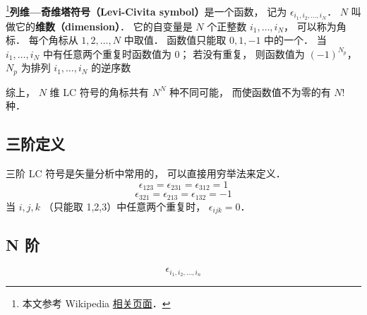 
\begin{issues}
\issueDraft
\end{issues}

\footnote{本文参考 Wikipedia \href{https://en.wikipedia.org/wiki/Levi-Civita_symbol}{相关页面}．}\textbf{列维—奇维塔符号（Levi-Civita symbol）}是一个函数， 记为 $\epsilon_{i_1, i_2, \dots, i_N}$． $N$ 叫做它的\textbf{维数（dimension）}． 它的自变量是 $N$ 个正整数 $i_1, \dots, i_N$， 可以称为角标． 每个角标从 $1, 2, \dots, N$ 中取值． 函数值只能取 $0, 1, -1$ 中的一个． 当 $i_1, \dots, i_N$ 中有任意两个重复时函数值为 0； 若没有重复， 则函数值为 $(-1)^{N_p}$， $N_p$ 为排列 $i_1, \dots, i_N$ 的逆序数

综上， $N$ 维 LC 符号的角标共有 $N^N$ 种不同可能， 而使函数值不为零的有 $N!$ 种．

\subsection{三阶定义}
三阶 LC 符号是矢量分析中常用的， 可以直接用穷举法来定义．
\begin{equation}
\epsilon_{123} = \epsilon_{231} = \epsilon_{312} = 1
\end{equation}
\begin{equation}
\epsilon_{321} = \epsilon_{213} = \epsilon_{132} = -1
\end{equation}
当 $i,j,k$ （只能取 1,2,3）中任意两个重复时， $\epsilon_{ijk} = 0$．

\subsection{N 阶}
\begin{equation}
\epsilon_{i_1,i_2,\dots, i_n}
\end{equation}

